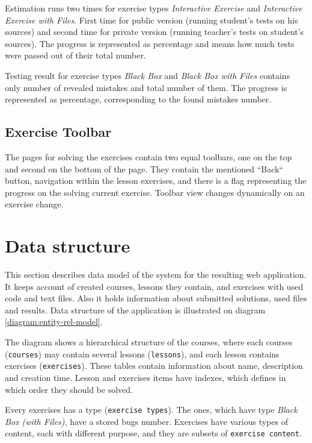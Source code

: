         Estimation runs two times for exercise types \textit{Interactive Exercise} and \textit{Interactive Exercise with Files}. First time for public version (running student's tests on his sources) and second time for private version (running teacher's tests on student's sources). The progress is represented as percentage and means how much tests were passed out of their total number.
        
        Testing result for exercise types \textit{Black Box} and \textit{Black Box with Files} contains only number of revealed mistakes and total number of them. The progress is represented as percentage, corresponding to the found mistakes number.
        
        \subsection{Exercise Toolbar}
        The pages for solving the exercises contain two equal toolbars, one on the top and second on the bottom of the page. They contain the mentioned ``Back`` button, navigation within the lesson exercises, and there is a flag representing the progress on the solving current exercise. Toolbar view changes dynamically on an exercise change.
    
    
    \section{Data structure}
    This section describes data model of the system for the resulting web application. It keeps account of created courses, lessons they contain, and exercises with used code and text files. Also it holds information about submitted solutions, used files and results. Data structure of the application is illustrated on diagram \ref{diagram:entity-rel-model}.

    The diagram shows a hierarchical structure of the courses, where each courses (\texttt{courses}) may contain several lessons (\texttt{lessons}), and each lesson contains exercises (\texttt{exercises}). These tables contain information about name, description and creation time. Lesson and exercises items have indexes, which defines in which order they should be solved.
    
    Every exercises has a type (\texttt{exercise types}). The ones, which have type \textit{Black Box (with Files)}, have a stored bugs number. Exercises have various types of content, each with different purpose, and they are subsets of \texttt{exercise content}.
    
